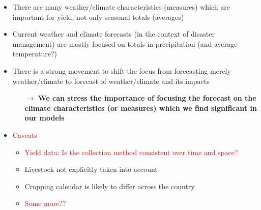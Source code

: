 \documentclass[a4paper,12pt]{article}
\begin{document}
	\begin{itemize}
	\item There are many weather/climate characteristics (measures) which are important for yield, not only seasonal totals (averages)
	\item  Current weather and climate forecasts (in the context of disaster management) are mostly focused on totals in precipitation (and average temperature?) 
	\item There is a strong movement to shift the focus from forecasting merely weather/climate to forecast of weather/climate and its impacts
	
	\begin{itemize}
	\item[$\boldsymbol{\rightarrow}$] \textbf{We can stress the importance of focusing the forecast on the climate characteristics (or measures) which we find significant in our models}
\end{itemize}

	\item \textcolor{red}{Caveats}
	
	\begin{itemize}
	\item\textcolor{red}{ Yield data: Is the collection method consistent over time and space?}
	\item Livestock not explicitly taken into account
	\item Cropping calendar is likely to differ across the country 
	\item \textcolor{red}{Some more??}
	
	\end{itemize}
\end{itemize}
\color{black}
\end{document}
